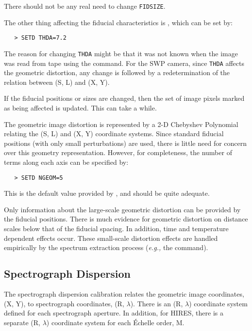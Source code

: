 There should not be any real need to change \verb+FIDSIZE+\@.

The other thing affecting the fiducial characteristics is
, which can be set by:

\begin{verbatim}
   > SETD THDA=7.2
\end{verbatim}

The reason for changing \verb+THDA+ might be that it was not known when the
image was read from tape using the 
 command.  For the SWP camera,
since \verb+THDA+ affects the geometric distortion, any change is followed by a
redetermination of the relation between (S, L) and (X, Y)\@.

If the fiducial positions or sizes are changed, then the set of image pixels
marked as being affected is updated. This can take a while.

The geometric image distortion is represented by a 2-D Chebyshev Polynomial
relating the (S, L) and (X, Y) coordinate systems.  Since standard fiducial
positions (with only small 
 perturbations) are used, there is
little need for concern over this geometry representation.  However, for
completeness, the number of terms along each axis can be specified by:

\begin{verbatim}
   > SETD NGEOM=5
\end{verbatim}

This is the default value provided by ,
and should be quite adequate.

Only information about the large-scale geometric distortion can be provided
by the fiducial positions.  There is much evidence for geometric distortion
on distance scales below that of the fiducial spacing.  In addition, time
and temperature dependent effects occur.  These small-scale distortion effects
are handled empirically by the spectrum extraction process ({\it{e.g.,}} the
 command)\@.


\subsection{Spectrograph Dispersion}

The spectrograph dispersion calibration relates the geometric image
coordinates, (X, Y), to spectrograph coordinates, (R, $\lambda$)\@.  There is
an (R, $\lambda$) coordinate system defined for each spectrograph aperture.  In
addition, for HIRES, there is a separate (R, $\lambda$) coordinate system for
each \'{E}chelle order, M\@.

